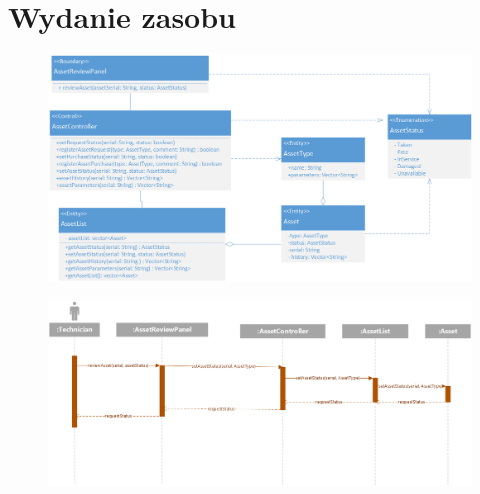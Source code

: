 \documentclass[11pt, a4paper, oneside]{report}
\begin{document}
\section{Wydanie zasobu}
\begin{figure}[H]
\centering
\includegraphics[scale=0.5]{techniczny_wydanie_zasobu_class.png}
\end{figure}
\begin{figure}[H]
\centering
\includegraphics[scale=0.5]{techniczny_wydanie_zasobu_sequence.png}
\end{figure}
\end{document}
